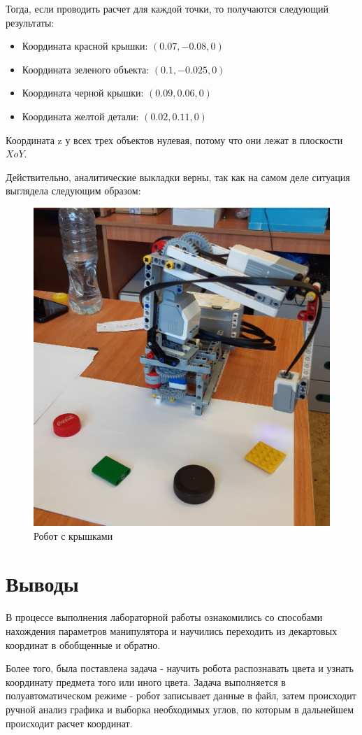 \documentclass{article}
\begin{document}
\par Тогда, если проводить расчет для каждой точки, то получаются следующий результаты:
\begin{itemize}
\item Координата красной крышки: $(0.07 , -0.08 , 0)$
\item Координата зеленого объекта: $(0.1 , -0.025 , 0)$
\item Координата черной крышки: $(0.09 , 0.06 , 0)$
\item Координата желтой детали: $(0.02 , 0.11 , 0)$
\end{itemize}
Координата z у всех трех объектов нулевая, потому что они лежат в плоскости $XoY$.
\par Действительно, аналитические выкладки верны, так как на самом деле ситуация выглядела следующим образом:
\begin{figure}[h!]
    \centering
    \includegraphics[width=300 pt]{robot_cups.jpg}
    \caption{Робот с крышками}
\end{figure}

\section{Выводы}
\par В процессе выполнения лабораторной работы ознакомились со способами нахождения параметров манипулятора и научились переходить из декартовых координат в обобщенные и обратно.
\par Более того, была поставлена задача - научить робота распознавать цвета и узнать координату предмета того или иного цвета. Задача выполняется в полуавтоматическом режиме - робот записывает данные в файл, затем происходит ручной анализ графика и выборка необходимых углов, по которым в дальнейшем происходит расчет координат.
\end{document}
